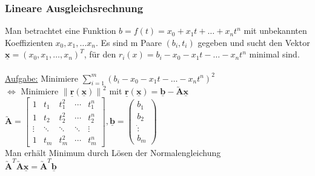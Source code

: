 \documentclass[6pt,a4paper]{scrartcl}
\let\olddot = \dot
\newcommand{\norm}[1]{\ensuremath{\|#1\|}}														%
\newcommand{\mat}[1]{\ensuremath{\begin{bmatrix} #1 \end{bmatrix}}}								%
\newcommand{\ma}[1]{\ensuremath{\utilde{\boldsymbol {#1}}}}										%
\newcommand{\vect}[1]{\ensuremath{\begin{pmatrix} #1 \end{pmatrix}}}							%
\newcommand{\svdots}{\ensuremath{\olddot :}}													%
\renewcommand{\vec}[1]{\ensuremath{\underline{\boldsymbol {#1}}}}								%
\renewcommand*{\dot}[1]{\accentset{\mbox{\textrm{\large\bfseries .}} }{#1}}						%
\begin{document}
\begin{multicols}{4}

\subsubsection{Lineare Ausgleichsrechnung}
Man betrachtet eine Funktion $b = f(t) = x_0 + x_1t + \ldots + x_nt^n$ mit unbekannten Koeffizienten $x_0, x_1, \ldots x_n$. Es sind m Paare $(b_i, t_i)$ gegeben und sucht
den Vektor $\vec x = (x_0, x_1, \ldots, x_n)^T$, für den $r_i(x) = b_i - x_0 - x_1t - \ldots - x_nt^n$ minimal sind. \\ \\
\underline{Aufgabe:} Minimiere $\sum\limits_{i = 1}^m (b_i - x_0 - x_1t - \ldots - x_nt^n)^2$ \\
$\Leftrightarrow$ Minimiere $\norm{\vec r(\vec x)}^2$ mit $\vec r(\vec x) = \vec b - \ma A \vec x$ \\
$\ma A = \mat{
	1 & t_1 & t_1^2 & \cdots & t_1^n \\
	1 & t_2 & t_2^2 & \cdots & t_2^n \\
	\vdots & \ddots & \ddots & \ddots & \vdots \\
	1 & t_m & t_m^2 & \cdots & t_m^n
}, \vec b = \vect{b_1 \\ b_2 \\ \svdots \\ b_m}$ \\
Man erhält Minimum durch Lösen der Normalengleichung \\
$\boxed{\ma A^T \ma A \vec x = \ma A^T \vec b}$


\end{multicols}
\end{document}
